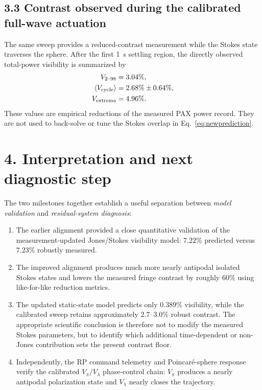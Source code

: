 \documentclass[10pt]{article}
\newcommand{\avg}[1]{\left\langle #1\right\rangle}
\begin{document}
\subsection*{3.3 Contrast observed during the calibrated full-wave actuation}
The same sweep provides a reduced-contrast measurement while the Stokes state traverses the sphere. After the first \SI{1}{s} settling region, the directly observed total-power visibility is summarized by
\begin{align*}
V_{2\text{--}98}&=3.04\%,\\
\avg{V_{\rm cycle}}&=2.68\%\pm0.64\%,\\
V_{\rm extrema}&=4.96\%.
\end{align*}
These values are empirical reductions of the measured PAX power record. They are not used to back-solve or tune the Stokes overlap in Eq.~\eqref{eq:newprediction}.

\section*{4. Interpretation and next diagnostic step}
The two milestones together establish a useful separation between \emph{model validation} and \emph{residual-system diagnosis}:
\begin{enumerate}[leftmargin=1.4em,itemsep=2pt,topsep=2pt]
\item The earlier alignment provided a close quantitative validation of the measurement-updated Jones/Stokes visibility model: $7.22\%$ predicted versus $7.23\%$ robustly measured.
\item The improved alignment produces much more nearly antipodal isolated Stokes states and lowers the measured fringe contrast by roughly 60\% using like-for-like reduction metrics.
\item The updated static-state model predicts only $0.389\%$ visibility, while the calibrated sweep retains approximately $2.7$--$3.0\%$ robust contrast. The appropriate scientific conclusion is therefore not to modify the measured Stokes parameters, but to identify which additional time-dependent or non-Jones contribution sets the present contrast floor.
\item Independently, the RP command telemetry and Poincar\'e-sphere response verify the calibrated $V_\pi/V_\lambda$ phase-control chain: $V_\pi$ produces a nearly antipodal polarization state and $V_\lambda$ nearly closes the trajectory.
\end{enumerate}
\end{document}
